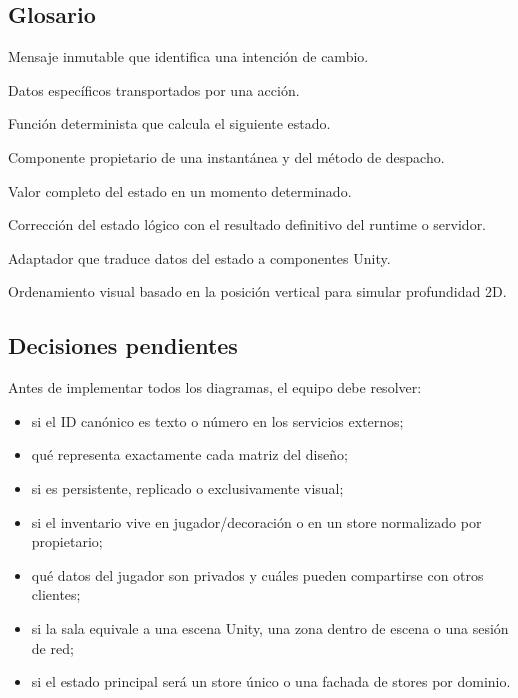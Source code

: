 \subsection{Glosario}

\begin{description}[style=nextline,leftmargin=3.1cm,labelwidth=2.8cm]
  \item[Acción] Mensaje inmutable que identifica una intención de cambio.
  \item[Payload] Datos específicos transportados por una acción.
  \item[Reductor] Función determinista que calcula el siguiente estado.
  \item[Store] Componente propietario de una instantánea y del método de despacho.
  \item[Instantánea] Valor completo del estado en un momento determinado.
  \item[Reconciliación] Corrección del estado lógico con el resultado definitivo del runtime o servidor.
  \item[Runtime applier] Adaptador que traduce datos del estado a componentes Unity.
  \item[Y-sort] Ordenamiento visual basado en la posición vertical para simular profundidad 2D.
\end{description}

\subsection{Decisiones pendientes}

Antes de implementar todos los diagramas, el equipo debe resolver:

\begin{itemize}
  \item si el ID canónico es texto o número en los servicios externos;
  \item qué representa exactamente cada matriz \code{[X,Y]} del diseño;
  \item si  es persistente, replicado o exclusivamente visual;
  \item si el inventario vive en jugador/decoración o en un store normalizado por propietario;
  \item qué datos del jugador son privados y cuáles pueden compartirse con otros clientes;
  \item si la sala equivale a una escena Unity, una zona dentro de escena o una sesión de red;
  \item si el estado principal será un store único o una fachada de stores por dominio.
\end{itemize}

